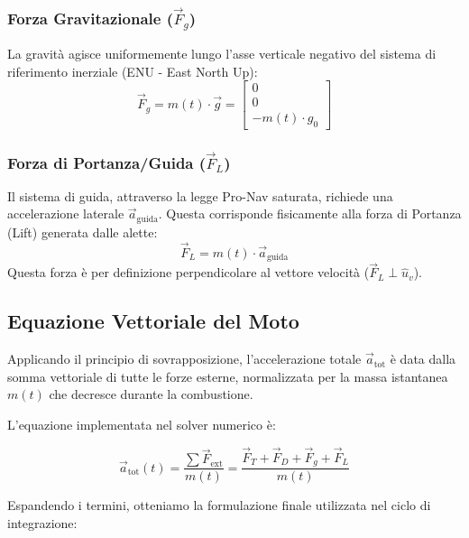 \documentclass[12pt,a4paper]{article}
\begin{document}
\subsubsection{Forza Gravitazionale ($\vec{F}_g$)}
La gravità agisce uniformemente lungo l'asse verticale negativo del sistema di riferimento inerziale (ENU - East North Up):
\begin{equation}
    \vec{F}_g = m(t) \cdot \vec{g} = \begin{bmatrix} 0 \\ 0 \\ -m(t) \cdot g_0 \end{bmatrix}
\end{equation}

\subsubsection{Forza di Portanza/Guida ($\vec{F}_L$)}
Il sistema di guida, attraverso la legge Pro-Nav saturata, richiede una accelerazione laterale $\vec{a}_{\text{guida}}$. Questa corrisponde fisicamente alla forza di Portanza (Lift) generata dalle alette:
\begin{equation}
    \vec{F}_L = m(t) \cdot \vec{a}_{\text{guida}}
\end{equation}
Questa forza è per definizione perpendicolare al vettore velocità ($\vec{F}_L \perp \hat{u}_v$).

\subsection{Equazione Vettoriale del Moto}
Applicando il principio di sovrapposizione, l'accelerazione totale $\vec{a}_{\text{tot}}$ è data dalla somma vettoriale di tutte le forze esterne, normalizzata per la massa istantanea $m(t)$ che decresce durante la combustione.

L'equazione implementata nel solver numerico è:

\begin{equation}
    \vec{a}_{\text{tot}}(t) = \frac{\sum \vec{F}_{\text{ext}}}{m(t)} = \frac{\vec{F}_T + \vec{F}_D + \vec{F}_g + \vec{F}_L}{m(t)}
\end{equation}

Espandendo i termini, otteniamo la formulazione finale utilizzata nel ciclo di integrazione:
\end{document}
